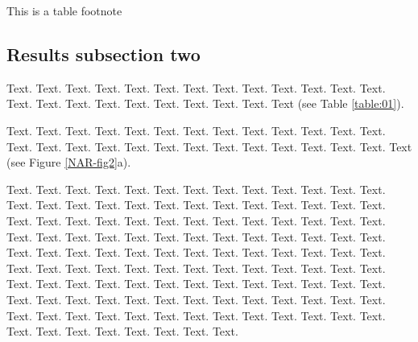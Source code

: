 \documentclass[a4,center,fleqn]{NAR}
\begin{document}
\begin{table}[b]
{This is a table footnote}
\end{table}


\subsection{Results subsection two}

Text.  Text. Text. Text. Text. Text. Text. Text. Text. Text. Text.
Text. Text. Text. Text. Text. Text. Text. Text. Text. Text. Text.
Text (see Table \ref{table:01}).

Text. Text. Text. Text. Text. Text.
Text. Text. Text. Text. Text. Text. Text. Text. Text. Text. Text.
Text. Text. Text. Text. Text. Text. Text. Text. Text.
Text (see Figure \ref{NAR-fig2}a).

Text. Text. Text. Text. Text.
Text. Text. Text. Text. Text. Text. Text. Text. Text. Text. Text.
Text. Text. Text. Text. Text. Text. Text. Text. Text. Text. Text.
Text. Text. Text. Text. Text. Text. Text. Text. Text. Text. Text.
Text. Text. Text. Text. Text. Text. Text. Text. Text. Text. Text.
Text. Text. Text. Text. Text. Text. Text. Text. Text. Text. Text.
Text. Text. Text. Text. Text. Text. Text. Text. Text. Text. Text.
Text. Text. Text. Text. Text. Text. Text. Text. Text. Text. Text.
Text. Text. Text. Text. Text. Text. Text. Text. Text. Text. Text.
Text. Text. Text. Text. Text. Text. Text. Text. Text. Text. Text.
Text. Text. Text. Text. Text. Text. Text. Text. Text. Text. Text.
Text. Text. Text. Text. Text. Text. Text. Text. Text. Text.
\end{document}
